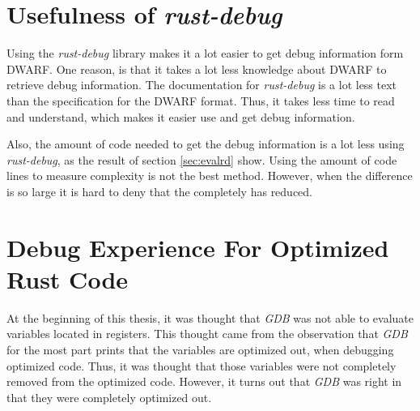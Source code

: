 


\section{Usefulness of \emph{rust-debug}} %
Using the \emph{rust-debug} library makes it a lot easier to get debug information form \gls{DWARF}.
One reason, is that it takes a lot less knowledge about \gls{DWARF} to retrieve debug information.
The documentation for \emph{rust-debug} is a lot less text than the specification for the \gls{DWARF} format.
Thus, it takes less time to read and understand, which makes it easier use and get debug information.


Also, the amount of code needed to get the debug information is a lot less using \emph{rust-debug}, as the result of section \ref{sec:evalrd} show.
Using the amount of code lines to measure complexity is not the best method.
However, when the difference is so large it is hard to deny that the completely has reduced. 





\section{Debug Experience For Optimized Rust Code} %
At the beginning of this thesis, it was thought that \emph{GDB} was not able to evaluate variables located in registers.
This thought came from the observation that \emph{GDB} for the most part prints that the variables are optimized out, when debugging optimized code.
Thus, it was thought that those variables were not completely removed from the optimized code.
However, it turns out that \emph{GDB} was right in that they were completely optimized out.


